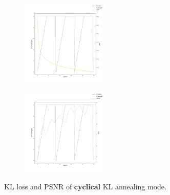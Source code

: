 	\begin{figure}[H]
		\centering
		\begin{subfigure}
			\centering
			\includegraphics[width=0.45\textwidth]{img/loss_cyc.png}
			\label{loss-cyc}
		\end{subfigure}
		\hfill
		\begin{subfigure}
			\centering
			\includegraphics[width=0.45\textwidth]{img/psnr_cyc.png}
			\label{psnr-cyc}
		\end{subfigure}
		\hfill
		\caption{KL loss and PSNR of \textbf{cyclical} KL annealing mode.}
		\label{result-cyc}
	\end{figure}

